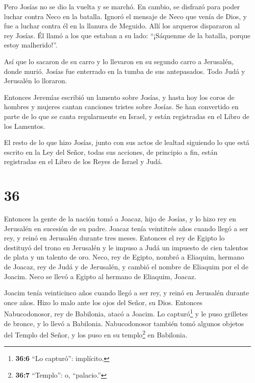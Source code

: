  Pero Josías no se dio la vuelta y se marchó. En cambio, se
disfrazó para poder luchar contra Neco en la batalla. Ignoró el mensaje
de Neco que venía de Dios, y fue a luchar contra él en la llanura de
Meguido.  Allí los arqueros dispararon al rey Josías. Él
llamó a los que estaban a su lado: ``¡Sáquenme de la batalla, porque
estoy malherido!''.

 Así que lo sacaron de su carro y lo llevaron en su segundo
carro a Jerusalén, donde murió. Josías fue enterrado en la tumba de sus
antepasados. Todo Judá y Jerusalén lo lloraron.

 Entonces Jeremías escribió un lamento sobre Josías, y
hasta hoy los coros de hombres y mujeres cantan canciones tristes sobre
Josías. Se han convertido en parte de lo que se canta regularmente en
Israel, y están registradas en el Libro de los Lamentos.

 El resto de lo que hizo Josías, junto con sus actos de
lealtad siguiendo lo que está escrito en la Ley del Señor, 
todas sus acciones, de principio a fin, están registradas en el Libro de
los Reyes de Israel y Judá.

\hypertarget{section-35}{%
\section{36}\label{section-35}}

 Entonces la gente de la nación tomó a Joacaz, hijo de
Josías, y lo hizo rey en Jerusalén en sucesión de su padre. 
Joacaz tenía veintitrés años cuando llegó a ser rey, y reinó en
Jerusalén durante tres meses.  Entonces el rey de Egipto lo
destituyó del trono en Jerusalén y le impuso a Judá un impuesto de cien
talentos de plata y un talento de oro.  Neco, rey de Egipto,
nombró a Eliaquim, hermano de Joacaz, rey de Judá y de Jerusalén, y
cambió el nombre de Eliaquim por el de Joacim. Neco se llevó a Egipto al
hermano de Eliaquim, Joacaz.

 Joacim tenía veinticinco años cuando llegó a ser rey, y
reinó en Jerusalén durante once años. Hizo lo malo ante los ojos del
Señor, su Dios.  Entonces Nabucodonosor, rey de Babilonia,
atacó a Joacim. Lo capturó\footnote{\textbf{36:6} ``Lo capturó'':
  implícito.} y le puso grilletes de bronce, y lo llevó a Babilonia.
 Nabucodonosor también tomó algunos objetos del Templo del
Señor, y los puso en su templo\footnote{\textbf{36:7} ``Templo'': o,
  ``palacio.''} en Babilonia.

